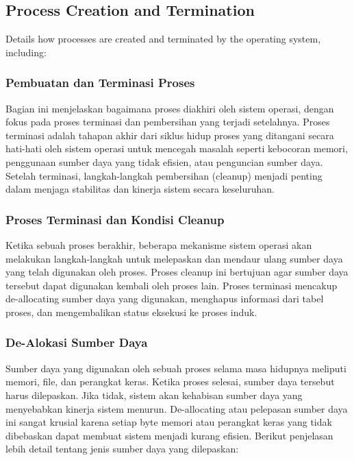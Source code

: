 \documentclass[12pt]{article}
\begin{document}
\subsection{Process Creation and Termination}
Details how processes are created and terminated by the operating system, including:
\subsubsection{Pembuatan dan Terminasi Proses}
Bagian ini menjelaskan bagaimana proses diakhiri oleh sistem operasi, dengan fokus pada proses terminasi dan pembersihan yang terjadi setelahnya. Proses terminasi adalah tahapan akhir dari siklus hidup proses yang ditangani secara hati-hati oleh sistem operasi untuk mencegah masalah seperti kebocoran memori, penggunaan sumber daya yang tidak efisien, atau penguncian sumber daya. Setelah terminasi, langkah-langkah pembersihan (cleanup) menjadi penting dalam menjaga stabilitas dan kinerja sistem secara keseluruhan.

\subsubsection{Proses Terminasi dan Kondisi Cleanup}
Ketika sebuah proses berakhir, beberapa mekanisme sistem operasi akan melakukan langkah-langkah untuk melepaskan dan mendaur ulang sumber daya yang telah digunakan oleh proses. Proses cleanup ini bertujuan agar sumber daya tersebut dapat digunakan kembali oleh proses lain. Proses terminasi mencakup de-allocating sumber daya yang digunakan, menghapus informasi dari tabel proses, dan mengembalikan status eksekusi ke proses induk.

\subsubsection{De-Alokasi Sumber Daya}
Sumber daya yang digunakan oleh sebuah proses selama masa hidupnya meliputi memori, file, dan perangkat keras. Ketika proses selesai, sumber daya tersebut harus dilepaskan. Jika tidak, sistem akan kehabisan sumber daya yang menyebabkan kinerja sistem menurun. De-allocating atau pelepasan sumber daya ini sangat krusial karena setiap byte memori atau perangkat keras yang tidak dibebaskan dapat membuat sistem menjadi kurang efisien. Berikut penjelasan lebih detail tentang jenis sumber daya yang dilepaskan:
\end{document}
